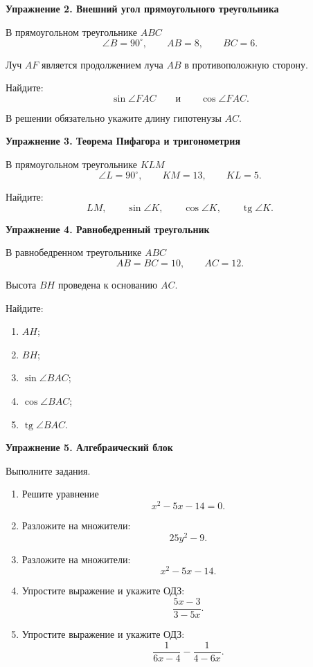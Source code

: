 \documentclass[a4paper,12pt]{article}
\DeclareMathOperator{\tg}{tg}
\begin{document}
\vspace{0.7em}

\textbf{Упражнение 2. Внешний угол прямоугольного треугольника}

В прямоугольном треугольнике $ABC$
\[
\angle B=90^\circ,\qquad
AB=8,\qquad
BC=6.
\]

Луч $AF$ является продолжением луча $AB$ в противоположную сторону.

Найдите:
\[
\sin\angle FAC
\qquad\text{и}\qquad
\cos\angle FAC.
\]

В решении обязательно укажите длину гипотенузы $AC$.

\vspace{0.7em}

\textbf{Упражнение 3. Теорема Пифагора и тригонометрия}

В прямоугольном треугольнике $KLM$
\[
\angle L=90^\circ,\qquad
KM=13,\qquad
KL=5.
\]

Найдите:
\[
LM,
\qquad
\sin\angle K,
\qquad
\cos\angle K,
\qquad
\tg\angle K.
\]

\vspace{0.7em}

\textbf{Упражнение 4. Равнобедренный треугольник}

В равнобедренном треугольнике $ABC$
\[
AB=BC=10,\qquad AC=12.
\]

Высота $BH$ проведена к основанию $AC$.

Найдите:

\begin{enumerate}[label=\alph*)]
    \item $AH$;
    \item $BH$;
    \item $\sin\angle BAC$;
    \item $\cos\angle BAC$;
    \item $\tg\angle BAC$.
\end{enumerate}

\vspace{0.7em}

\textbf{Упражнение 5. Алгебраический блок}

Выполните задания.

\begin{enumerate}[label=\alph*)]
    \item Решите уравнение
    \[
    x^2-5x-14=0.
    \]

    \item Разложите на множители:
    \[
    25y^2-9.
    \]

    \item Разложите на множители:
    \[
    x^2-5x-14.
    \]

    \item Упростите выражение и укажите ОДЗ:
    \[
    \frac{5x-3}{3-5x}.
    \]

    \item Упростите выражение и укажите ОДЗ:
    \[
    \frac{1}{6x-4}
    -
    \frac{1}{4-6x}.
    \]
\end{enumerate}
\end{document}
